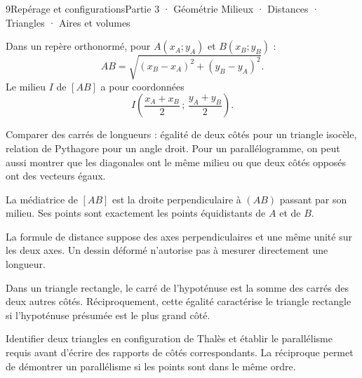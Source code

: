 \begin{ouverture}[cercleplan]{9}{Repérage et configurations}{Partie 3 · Géométrie}
{Milieux · Distances · Triangles · Aires et volumes}
\end{ouverture}
\pagestyle{otMain}\essentiel\fontsize{11}{15}\selectfont
{}
\begin{propriete}Dans un repère orthonormé, pour $A(x_A;y_A)$ et $B(x_B;y_B)$ :
\[AB=\sqrt{(x_B-x_A)^2+(y_B-y_A)^2}.\]
Le milieu $I$ de $[AB]$ a pour coordonnées
\[I\left(\frac{x_A+x_B}{2}\,;\,\frac{y_A+y_B}{2}\right).\]
\end{propriete}
\begin{savoirfaire}
Comparer des carrés de longueurs : égalité de deux côtés pour un triangle isocèle, relation de Pythagore pour un angle droit. Pour un parallélogramme, on peut aussi montrer que les diagonales ont le même milieu ou que deux côtés opposés ont des vecteurs égaux.
\end{savoirfaire}
\begin{definition}La médiatrice de $[AB]$ est la droite perpendiculaire à $(AB)$ passant par son milieu. Ses points sont exactement les points équidistants de $A$ et de $B$.\end{definition}
\begin{attention}La formule de distance suppose des axes perpendiculaires et une même unité sur les deux axes. Un dessin déformé n’autorise pas à mesurer directement une longueur.\end{attention}
\clearpage
{}
\begin{propriete}Dans un triangle rectangle, le carré de l’hypoténuse est la somme des carrés des deux autres côtés. Réciproquement, cette égalité caractérise le triangle rectangle si l’hypoténuse présumée est le plus grand côté.\end{propriete}
\begin{savoirfaire}[Thalès]Identifier deux triangles en configuration de Thalès et établir le parallélisme requis avant d’écrire des rapports de côtés correspondants. La réciproque permet de démontrer un parallélisme si les points sont dans le même ordre.\end{savoirfaire}
